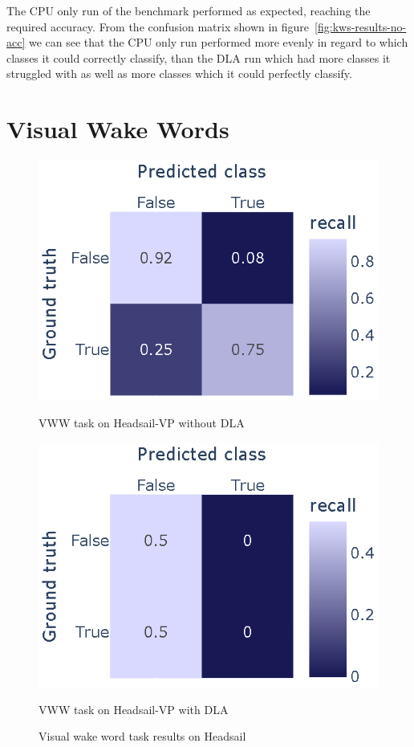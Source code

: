 \documentclass[12pt,a4paper,english
]{tunithesis}
\begin{document}
The CPU only run of the benchmark performed as expected, reaching the required accuracy. From the confusion matrix shown in figure~\ref{fig:kws-results-no-acc} we can see that the CPU only run performed more evenly in regard to which classes it could correctly classify, than the DLA run which had more classes it struggled with as well as more classes which it could perfectly classify.

\section{Visual Wake Words}
\begin{figure}
\centering
\begin{minipage}{.45\textwidth}
  \centering
  \includegraphics[width=\linewidth]{img/vww_200_no_acc.eps}
  \caption{VWW task on Headsail-VP without DLA}
  \label{fig:vww-no-acc}
\end{minipage}
\begin{minipage}{.45\textwidth}
  \centering
  \includegraphics[width=\linewidth]{img/vww_200_acc.eps}
  \caption{VWW task on Headsail-VP with DLA}
  \label{fig:vww-dla}
\end{minipage}%
\caption{Visual wake word task results on Headsail}
\label{fig:vww-results}
\end{figure}
\end{document}

